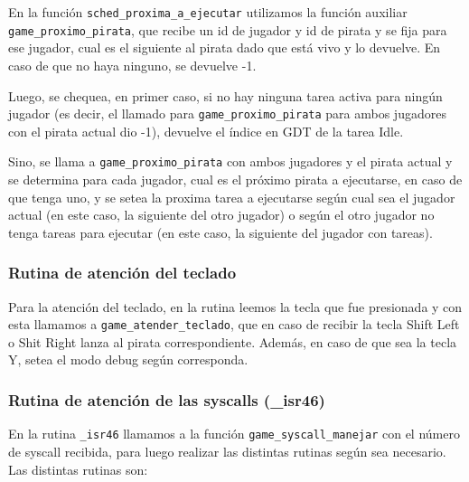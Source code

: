 En la función \texttt{sched\_proxima\_a\_ejecutar} utilizamos la función auxiliar \texttt{game\_proximo\_pirata}, que recibe un id de jugador y id de pirata y se fija para ese jugador, cual es el siguiente al pirata dado que está vivo y lo devuelve. En caso de que no haya ninguno, se devuelve -1.

Luego, se chequea, en primer caso, si no hay ninguna tarea activa para ningún jugador (es decir, el llamado para \texttt{game\_proximo\_pirata} para ambos jugadores con el pirata actual dio -1), devuelve el índice en GDT de la tarea Idle.

Sino, se llama a \texttt{game\_proximo\_pirata} con ambos jugadores y el pirata actual y se determina para cada jugador, cual es el próximo pirata a ejecutarse, en caso de que tenga uno, y se setea la proxima tarea a ejecutarse según cual sea el jugador actual (en este caso, la siguiente del otro jugador) o según el otro jugador no tenga tareas para ejecutar (en este caso, la siguiente del jugador con tareas). 


\subsubsection{Rutina de atención del teclado}

Para la atención del teclado, en la rutina leemos la tecla que fue presionada y con esta llamamos a \texttt{game\_atender\_teclado}, que en caso de recibir la tecla Shift Left o Shit Right lanza al pirata correspondiente. Además, en caso de que sea la tecla Y, setea el modo debug según corresponda.

\subsubsection{Rutina de atención de las syscalls (\_isr46)}

En la rutina \texttt{\_isr46} llamamos a la función \texttt{game\_syscall\_manejar} con el número de syscall recibida, para luego realizar las distintas rutinas según sea necesario. Las distintas rutinas son:

